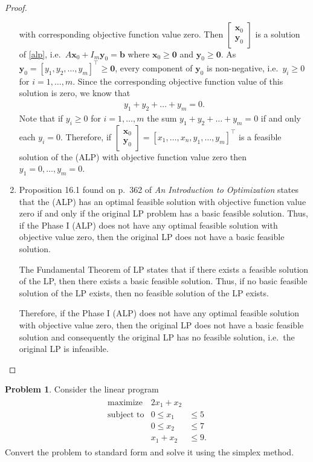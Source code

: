 \documentclass[12pt]{article}
\theoremstyle{definition}
\newtheorem{problem}{Problem}
\newcommand{\vect}[1]{\boldsymbol{#1}}
\begin{document}
\begin{proof}
\begin{enumerate}
      with corresponding objective function value zero. Then
      $\begin{bmatrix}\vect{x}_0 \\ \vect{y}_0\end{bmatrix}$ is a solution of
      \eqref{alp}, i.e.\ $A\vect{x}_0 + I_m\vect{y}_0 = \vect{b}$ where
      $\vect{x}_0 \geq \vect{0}$ and $\vect{y}_0 \geq \vect{0}$.
      As $\vect{y}_0 = [y_1, y_2, \dots, y_m]^\intercal \geq \vect{0}$, every
      component of $\vect{y}_0$ is non-negative, i.e.\ $y_i \geq 0$ for
      $i=1,\dots,m$. Since the corresponding objective function value of this
      solution is zero, we know that
      \begin{align*}
        y_1 + y_2 + \dots + y_m = 0.
      \end{align*}
      Note that if $y_i \geq 0$ for $i = 1, \dots, m$ the sum $y_1 + y_2 + \dots + y_m = 0$
      if and only each $y_i = 0$. Therefore, if
      $\begin{bmatrix}\vect{x}_0 \\ \vect{y}_0\end{bmatrix} = [x_1, \dots, x_n, y_1, \dots, y_m]^\intercal$
      is a feasible solution of the (ALP) with objective function value zero
      then $y_1 = 0, \dots, y_m = 0$.
    \item Proposition 16.1 found on p.\ 362 of \textit{An Introduction to Optimization}
      states that the (ALP) has an optimal feasible solution with objective
      function value zero if and only if the original LP problem has a basic feasible solution.
      Thus, if the Phase I (ALP) does not have any optimal feasible solution with objective value zero,
      then the original LP does not have a basic feasible solution.

      The Fundamental Theorem of LP states that if there exists a feasible solution
      of the LP, then there exists a basic feasible solution. Thus, if no basic
      feasible solution of the LP exists, then no feasible solution of the LP exists.

      Therefore, if the Phase I (ALP) does not have any optimal feasible solution
      with objective value zero, then the original LP does not have a basic feasible
      solution and consequently the original LP has no feasible solution, i.e.\ the original LP
      is infeasible.
  \end{enumerate}
\end{proof}
\newpage


\begin{problem}
  Consider the linear program
  \begin{align*}
    \begin{array}{rrl}
      \text{maximize} & 2x_1 + x_2 &\\
      \text{subject to} & 0 \leq x_1 &\leq 5 \\
      & 0 \leq x_2 &\leq 7 \\
      & x_1 + x_2 &\leq 9.
    \end{array}
  \end{align*}
  Convert the problem to standard form and solve it using the simplex method.
\end{problem}
\end{document}
